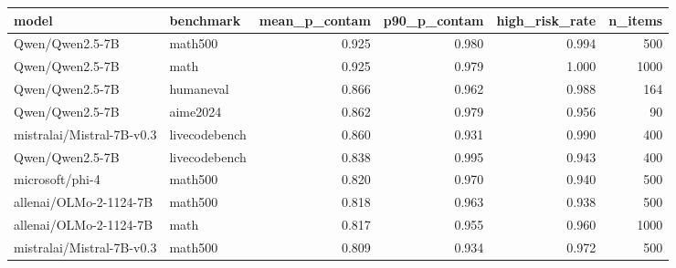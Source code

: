 \begin{tabular}{llrrrr}
\toprule
model & benchmark & mean_p_contam & p90_p_contam & high_risk_rate & n_items \\
\midrule
Qwen/Qwen2.5-7B & math500 & 0.925 & 0.980 & 0.994 & 500 \\
Qwen/Qwen2.5-7B & math & 0.925 & 0.979 & 1.000 & 1000 \\
Qwen/Qwen2.5-7B & humaneval & 0.866 & 0.962 & 0.988 & 164 \\
Qwen/Qwen2.5-7B & aime2024 & 0.862 & 0.979 & 0.956 & 90 \\
mistralai/Mistral-7B-v0.3 & livecodebench & 0.860 & 0.931 & 0.990 & 400 \\
Qwen/Qwen2.5-7B & livecodebench & 0.838 & 0.995 & 0.943 & 400 \\
microsoft/phi-4 & math500 & 0.820 & 0.970 & 0.940 & 500 \\
allenai/OLMo-2-1124-7B & math500 & 0.818 & 0.963 & 0.938 & 500 \\
allenai/OLMo-2-1124-7B & math & 0.817 & 0.955 & 0.960 & 1000 \\
mistralai/Mistral-7B-v0.3 & math500 & 0.809 & 0.934 & 0.972 & 500 \\
\bottomrule
\end{tabular}
